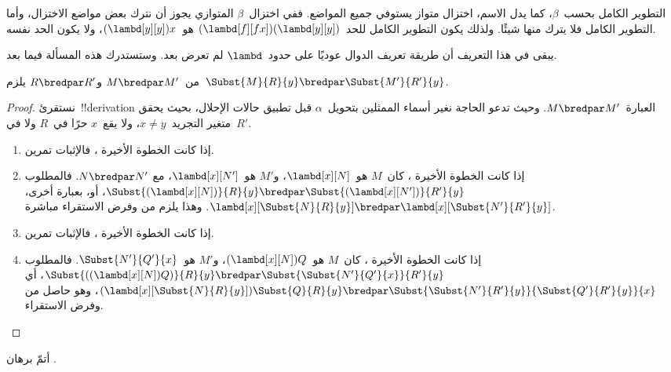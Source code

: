 \documentclass[../../../include/open-logic-section]{subfiles}
\begin{document}
التطوير الكامل بحسب~$\beta$، كما يدل الاسم، اختزال متواز يستوفي جميع المواضع.
ففي اختزال~$\beta$ المتوازي يجوز أن نترك بعض مواضع الاختزال،
وأما التطوير الكامل فلا يترك منها شيئًا.
ولذلك يكون التطوير الكامل للحد~$(\lambd[f][fx])(\lambd[y][y])$ هو~$(\lambd[y][y])x$، ولا يكون الحد نفسه.

\begin{editorial}
  يبقى في هذا التعريف أن طريقة تعريف الدوال عوديًا على حدود~$\lambd$ لم تعرض بعد.
  وستستدرك هذه المسألة فيما بعد.
\end{editorial}

\begin{lem}
  من~$M \bredpar M'$ و$R \bredpar R'$ يلزم~$\Subst{M}{R}{y}
  \bredpar \Subst{M'}{R'}{y}$.
\end{lem}

\begin{proof}
  نستقرئ~!!{derivation} العبارة~$M \bredpar M'$.
  وحيث تدعو الحاجة نغير أسماء الممثلين بتحويل~$\alpha$ قبل تطبيق حالات الإحلال،
  بحيث يحقق متغير التجريد~$x \ne y$، ولا يقع~$x$ حرًا في~$R$ ولا في~$R'$.
  \begin{enumerate}
    \item إذا كانت الخطوة الأخيرة ، فالإثبات تمرين.
    \item إذا كانت الخطوة الأخيرة ، كان~$M$
      هو~$\lambd[x][N]$، و$M'$ هو~$\lambd[x][N']$، مع
      $N \bredpar N'$. فالمطلوب
      $\Subst{(\lambd[x][N])}{R}{y} \bredpar
      \Subst{(\lambd[x][N'])}{R'}{y}$، أو، بعبارة أخرى،
      $\lambd[x][\Subst{N}{R}{y}] \bredpar
      \lambd[x][\Subst{N'}{R'}{y}]$. وهذا يلزم من
       وفرض الاستقراء مباشرة.
    \item إذا كانت الخطوة الأخيرة ، فالإثبات تمرين.
    \item إذا كانت الخطوة الأخيرة ، كان~$M$
      هو~$(\lambd[x][N])Q$، و$M'$ هو~$\Subst{N'}{Q'}{x}$. فالمطلوب
      $\Subst{((\lambd[x][N])Q)}{R}{y} \bredpar
      \Subst{\Subst{N'}{Q'}{x}}{R'}{y}$، أي
      $(\lambd[x][\Subst{N}{R}{y}])\Subst{Q}{R}{y} \bredpar
      \Subst{\Subst{N'}{R'}{y}}{\Subst{Q'}{R'}{y}}{x}$، وهو حاصل من
       وفرض الاستقراء.
  \end{enumerate}
\end{proof}

\begin{prob}
  أتمّ برهان .
\end{prob}
\end{document}

